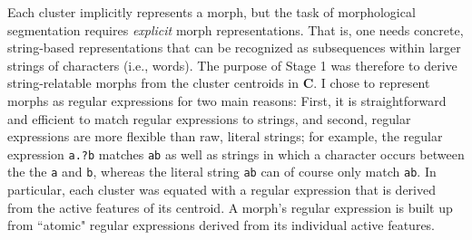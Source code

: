 Each cluster implicitly represents a morph, but the task of morphological segmentation requires \emph{explicit} morph representations.
 That is, one needs concrete, string-based representations that can be recognized as subsequences within larger strings of characters (i.e., words). 
The purpose of Stage 1 was therefore to derive string-relatable morphs from the cluster centroids in $\mathbf{C}$.
I chose to represent morphs as regular expressions for two main reasons: First, it is straightforward and efficient to match regular expressions to strings, and second, regular expressions are more flexible than raw, literal strings; for example, the regular expression 
\texttt{a.?b} matches \texttt{ab} as well as strings in which a character occurs between the 
the \texttt{a} and \texttt{b}, whereas the literal string \texttt{ab} can of course only match \texttt{ab}.  
In particular, each 
cluster was equated with a regular expression that is derived from the active 
features of its centroid. A morph's regular expression is built 
up from ``atomic" regular expressions derived from its 
individual active features. 

